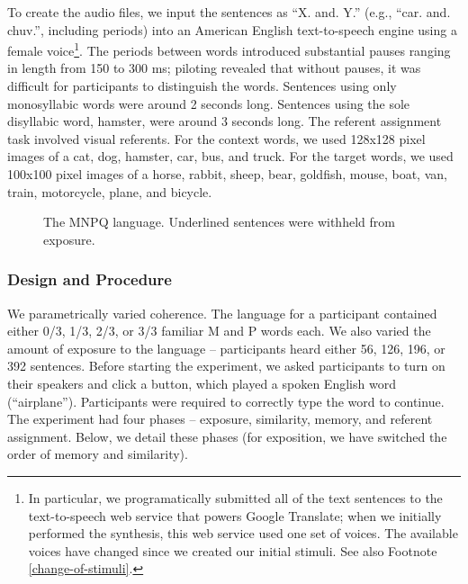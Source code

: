 \documentclass[man,floatsintext]{apa6}
\begin{document}
To create the audio files, we input the sentences as ``X. and. Y.'' (e.g., ``car. and. chuv.'', including periods) into an American English text-to-speech engine using a female voice\footnote{\label{tts}In particular, we programatically submitted all of the text sentences to the text-to-speech web service that powers Google Translate; when we initially performed the synthesis, this web service used one set of voices. The available voices have changed since we created our initial stimuli. See also Footnote \ref{change-of-stimuli}.}. The periods between words introduced substantial pauses ranging in length from 150 to 300 ms; piloting revealed that without pauses, it was difficult for participants to distinguish the words. Sentences using only monosyllabic words were around 2 seconds long. Sentences using the sole disyllabic word, hamster, were around 3 seconds long.  The referent assignment task involved visual referents. For the context words, we used 128x128 pixel images of a cat, dog, hamster, car, bus, and truck. For the target words, we used 100x100 pixel images of a horse, rabbit, sheep, bear, goldfish, mouse, boat, van, train, motorcycle, plane, and bicycle.

\begin{figure}[t]
  \begin{center} \vskip 0.12in 
    \caption{The MNPQ language. Underlined sentences were withheld
from exposure.}
    \label{mnpq-table}
  \end{center}
\end{figure}

\subsubsection{Design and Procedure}

We parametrically varied coherence. The language for a participant contained either 0/3, 1/3, 2/3, or 3/3 familiar M and P words each. We also varied the amount of exposure to the language -- participants heard either 56, 126, 196, or 392 sentences. Before starting the experiment, we asked participants to turn on their speakers and click a button, which played a spoken English word (``airplane''). Participants were required to correctly type the word to continue. The experiment had four phases -- exposure, similarity, memory, and referent assignment. Below, we detail these phases (for exposition, we have switched the order of memory and similarity).
\end{document}
